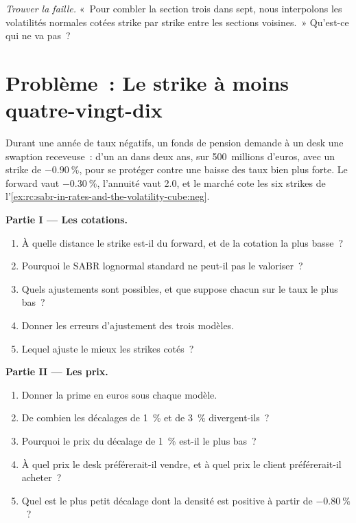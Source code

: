 \begin{exercise}[$\star\star\star$]\label{exo:rc:sabr-in-rates-and-the-volatility-cube:8}
\emph{Trouver la faille.} «~Pour combler la section trois dans sept, nous interpolons les
volatilités normales cotées strike par strike entre les sections voisines.~»
Qu'est-ce qui ne va pas~?
\end{exercise}

\section{Problème~: Le strike à moins quatre-vingt-dix}

\begin{problem}\label{pb:rc:sabr-in-rates-and-the-volatility-cube:1}
Durant une année de taux négatifs, un fonds de pension demande à un desk une swaption receveuse~:
d'un an dans deux ans, sur 500~millions d'euros, avec un strike de $-0.90~\%$, pour se protéger
contre une baisse des taux bien plus forte. Le forward vaut $-0.30~\%$, l'annuité
vaut 2.0, et le marché cote les six strikes de
l'\cref{ex:rc:sabr-in-rates-and-the-volatility-cube:neg}.

\medskip\noindent\textbf{Partie I --- Les cotations.}
\begin{enumerate}
\item À quelle distance le strike est-il du forward, et de la cotation la plus basse~?
\item Pourquoi le SABR lognormal standard ne peut-il pas le valoriser~?
\item Quels ajustements sont possibles, et que suppose chacun sur le taux le plus bas~?
\item Donner les erreurs d'ajustement des trois modèles.
\item Lequel ajuste le mieux les strikes cotés~?
\end{enumerate}

\medskip\noindent\textbf{Partie II --- Les prix.}
\begin{enumerate}[resume]
\item Donner la prime en euros sous chaque modèle.
\item De combien les décalages de 1~\% et de 3~\% divergent-ils~?
\item Pourquoi le prix du décalage de 1~\% est-il le plus bas~?
\item À quel prix le desk préférerait-il vendre, et à quel prix le client préférerait-il
acheter~?
\item Quel est le plus petit décalage dont la densité est positive à partir de $-0.80~\%$~?
\end{enumerate}


\end{problem}
